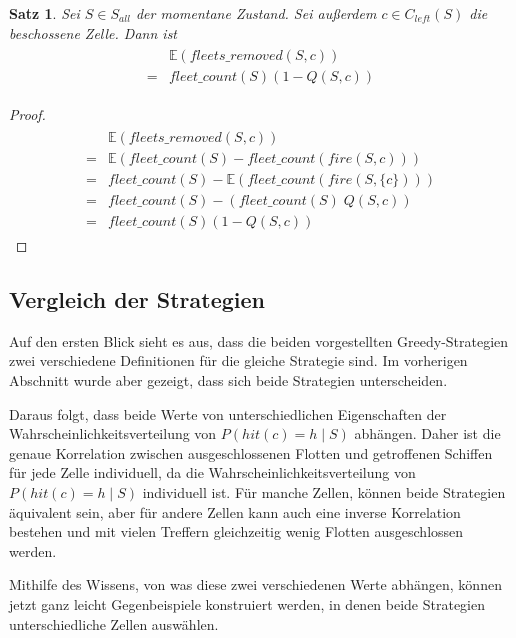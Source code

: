 \documentclass[a4paper,12pt]{llncs}
\numberwithin{equation}{section}
\newtheorem{satz}{Satz}
\begin{document}
\begin{satz}
Sei $S\in S_{all}$ der momentane Zustand.
Sei außerdem $c \in C_{left}(S)$ die beschossene Zelle.
Dann ist
\begin{align}
\begin{split}
&\mathds{E}(fleets\_removed(S,c))\\
=&fleet\_count(S) (1 - Q(S,c))
\end{split}
\end{align}
\end{satz}

\begin{proof}
\begin{align}
\begin{split}
&\mathds{E}(fleets\_removed(S,c))\\
=&\mathds{E}(fleet\_count(S) - fleet\_count(fire(S,c)))\\
=&fleet\_count(S) - \mathds{E}(fleet\_count(fire(S,\{c\})))\\
=&fleet\_count(S) - (fleet\_count(S)\; Q(S,c))\\
=&fleet\_count(S) (1 - Q(S,c))
\end{split}
\end{align}
\end{proof}

\subsection{Vergleich der Strategien}
Auf den ersten Blick sieht es aus, dass die beiden vorgestellten Greedy-Strategien zwei verschiedene Definitionen für die gleiche Strategie sind. Im vorherigen Abschnitt wurde aber gezeigt, dass sich beide Strategien unterscheiden.

Daraus folgt, dass beide Werte von unterschiedlichen Eigenschaften der Wahrscheinlichkeitsverteilung von $P(hit(c)=h \mid S)$ abhängen. Daher ist die genaue Korrelation zwischen ausgeschlossenen Flotten und getroffenen Schiffen für jede Zelle individuell, da die Wahrscheinlichkeitsverteilung von $P(hit(c)=h \mid S)$ individuell ist. Für manche Zellen, können beide Strategien äquivalent sein, aber für andere Zellen kann auch eine inverse Korrelation bestehen und mit vielen Treffern gleichzeitig wenig Flotten ausgeschlossen werden.

Mithilfe des Wissens, von was diese zwei verschiedenen Werte abhängen, können jetzt ganz leicht Gegenbeispiele konstruiert werden, in denen beide Strategien unterschiedliche Zellen auswählen.
\end{document}
